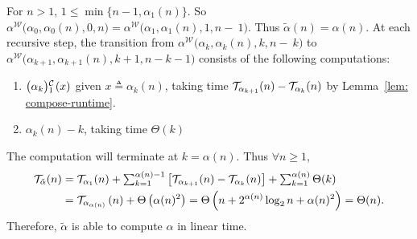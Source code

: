 For $n > 1$, $1\le \min\big\{n-1, \alpha_1(n)\big\}$. So
$\alpha^{\mathcal{W}}\big(\alpha_0, \alpha_0(n), 0, n\big) =
\alpha^{\mathcal{W}}\big(\alpha_1, \alpha_1(n), 1, n-~1\big)$.
Thus $\tilde{\alpha}(n) = \alpha(n)$. At each recursive step, the transition from $\alpha^{\mathcal{W}}\big(\alpha_k, \alpha_k(n), k, n-~k\big)$ to $\alpha^{\mathcal{W}}\big(\alpha_{k+1}, \alpha_{k+1}(n), k+1, n-k-1\big)$ consists of the following computations:
 \begin{enumerate} %
	\item $\cdt{\big(\alpha_k\big)}{1}(x)$ given $x\triangleq \alpha_k(n)$, taking time $\mathcal{T}_{\alpha_{k+1}}(n) - \mathcal{T}_{\alpha_k}(n)$ by Lemma~\ref{lem: compose-runtime}.
	\item $\alpha_k(n) - k$, taking time $\Theta(k)$
\end{enumerate}
The computation will terminate at $k = \alpha(n)$. Thus $\forall n\ge 1$,
\begin{equation} \label{eq: inv-ack-runtime-improved}
\begin{aligned}
\mathcal{T}_{\tilde{\alpha}}(n)
& = \textstyle \mathcal{T}_{\alpha_1}(n) + \sum_{k=1}^{\alpha(n) - 1}
\left[ \mathcal{T}_{\alpha_{k+1}}(n) - \mathcal{T}_{\alpha_k}(n)
\right] + \sum_{k=1}^{\alpha(n)}\Theta(k) \\
& = \mathcal{T}_{\alpha_{\alpha(n)}}\left(n\right) + \Theta\left(\alpha(n)^2\right)
= \Theta\left(n + 2^{\alpha(n)}\log_2n + \alpha(n)^2\right) = \Theta(n).
\end{aligned}
\end{equation}
Therefore, $\tilde{\alpha}$ is able to compute $\alpha$ in linear time.
